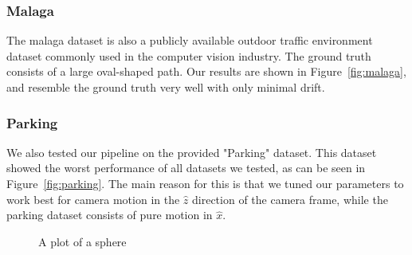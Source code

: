 \documentclass[11pt]{article}
\newlength\figureheight
\newlength\figurewidth
\begin{document}
\subsubsection{Malaga}
The malaga dataset is also a publicly available outdoor traffic environment dataset commonly used in the computer vision industry. The ground truth consists of a large oval-shaped path. Our results are shown in Figure~\ref{fig:malaga}, and resemble the ground truth very well with only minimal drift.

\subsubsection{Parking}
We also tested our pipeline on the provided "Parking" dataset. This dataset showed the worst performance of all datasets we tested, as can be seen in Figure~\ref{fig:parking}. The main reason for this is that we tuned our parameters to work best for camera motion in the $\hat{z}$ direction of the camera frame, while the parking dataset consists of pure motion in $\hat{x}$.


\begin{figure}
	\centering
	\setlength\figureheight{10cm} 
	\setlength\figurewidth{15cm}
	
	\caption{A plot of a sphere}
	\label{fig:sphere}
\end{figure}
\end{document}
